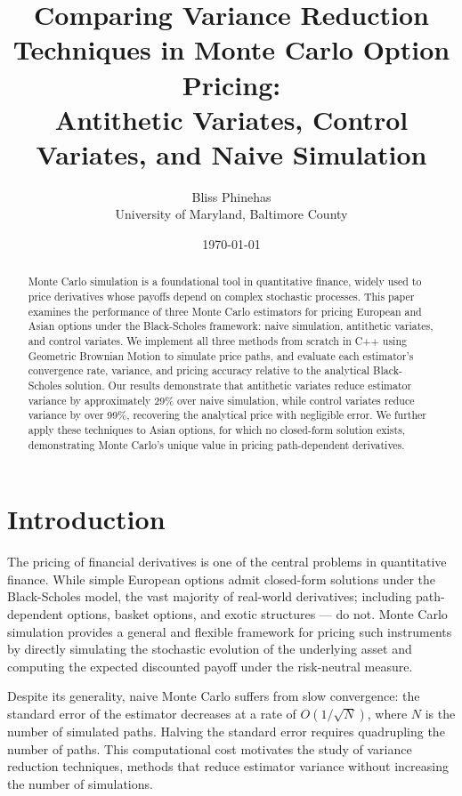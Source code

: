 \documentclass[12pt]{article}
\title{Comparing Variance Reduction Techniques in Monte Carlo Option Pricing:\\
Antithetic Variates, Control Variates, and Naive Simulation}
\author{Bliss Phinehas\\
University of Maryland, Baltimore County}
\date{\today}
\begin{document}
\maketitle
\newpage
\tableofcontents
\newpage

\begin{abstract}
Monte Carlo simulation is a foundational tool in quantitative finance,
widely used to price derivatives whose payoffs depend on complex stochastic
processes. This paper examines the performance of three Monte Carlo estimators
for pricing European and Asian options under the Black-Scholes framework:
naive simulation, antithetic variates, and control variates. We implement all
three methods from scratch in C++ using Geometric Brownian Motion to simulate
price paths, and evaluate each estimator's convergence rate, variance, and
pricing accuracy relative to the analytical Black-Scholes solution. Our results
demonstrate that antithetic variates reduce estimator variance by approximately
29\% over naive simulation, while control variates reduce variance by over 99\%,
recovering the analytical price with negligible error. We further apply these
techniques to Asian options, for which no closed-form solution exists,
demonstrating Monte Carlo's unique value in pricing path-dependent derivatives.
\end{abstract}
\newpage

\section{Introduction}

The pricing of financial derivatives is one of the central problems in
quantitative finance. While simple European options admit closed-form solutions
under the Black-Scholes model, the vast majority of real-world derivatives;
including path-dependent options, basket options, and exotic structures --- do
not. Monte Carlo simulation provides a general and flexible framework for
pricing such instruments by directly simulating the stochastic evolution of
the underlying asset and computing the expected discounted payoff under the
risk-neutral measure.

Despite its generality, naive Monte Carlo suffers from slow convergence: the
standard error of the estimator decreases at a rate of $O(1/\sqrt{N})$, where
$N$ is the number of simulated paths. Halving the standard error requires
quadrupling the number of paths. This computational cost motivates the study
of variance reduction techniques, methods that reduce estimator variance
without increasing the number of simulations.
\end{document}
